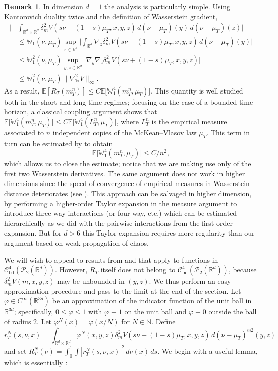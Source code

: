 \documentclass[11pt,reqno]{amsart}
\numberwithin{equation}{section}
\theoremstyle{definition}
\newtheorem{remark}[theorem]{Remark}
\def\E{{\mathbb E}}
\def\R{{\mathbb R}}
\def\N{{\mathbb N}}
\newcommand{\wgrad}{\nabla_{\W}}
\newcommand{\W}{\mathbb W}
\begin{document}
\begin{remark} \label{rem:d=1}
    In dimension $d=1$ the analysis is particularly simple. Using Kantorovich duality twice and the definition of Wasserstein gradient,
    \begin{align*}
        \Big|&\int_{\R^d\times \R^d} \delta_m^2  V(s\nu+(1-s)\mu_T,x,y,z)\,d(\nu-\mu_T)(y)\,d(\nu-\mu_T)(z)\Big|\\
        &\leq \W_1(\nu,\mu_T)\sup_{z\in \R^d} \Big|\int_{\R^d}\nabla_z\delta_m^2 V(s\nu+(1-s)\mu_T,x,y,z)\,d(\nu-\mu_T)(y)\Big|\\
        &\leq \W_1^2(\nu,\mu_T)\sup_{y,z\in \R^d} \Big|\nabla_y\nabla_z\delta_m^2 V(s\nu+(1-s)\mu_T,x,y,z)\Big|\\
        &\leq \W_1^2(\nu,\mu_T)\|\wgrad^2 V\|_{\infty}.
    \end{align*}
    As a result, $\E[R_T(m_T^n)]\leq C\E\big[\W_1^4(m_T^n,\mu_T)\big]$. This quantity is well studied both in the short and long time regimes; focusing on the case of a bounded time horizon, a classical coupling argument shows that $\E\big[\W_1^4(m_T^n,\mu_T)\big]\leq C\E\big[\W_1^4(L_T^n,\mu_T)\big]$, where $L_T^n$ is the empirical measure associated to $n$ independent copies of the McKean--Vlasov law $\mu_T$. This term in turn  can be estimated by \cite[Theorem 2]{Fournier2015-yh} to obtain
    \[\E\big[\W_1^4(m_T^n,\mu_T)\big]\leq C/n^2,\]
    which allows us to close the estimate; notice that we are making use only of the first two Wasserstein derivatives. The same argument does not work in higher dimensions since the speed of convergence of empirical measures in Wasserstein distance deteriorates (see \cite[Theorem 1]{Fournier2015-yh}). This approach can be salvaged in higher dimension, by performing a higher-order Taylor expansion in the measure argument  to introduce three-way interactions (or four-way, etc.) which can be estimated hierarchically as we did with the pairwise interactions from the first-order expansion. But for $d>6$ this Taylor expansion requires more regularity than our argument based on weak propagation of chaos. 
\end{remark}

We will wish  to appeal to results from \cite{Buckdahn2017-op} and \cite{Chassagneux2022-jt} that apply to functions in $\mathcal C_{\text{bd}}^4(\mathcal P_2(\R^d))$. However, $R_T$ itself does not belong to $\mathcal C_{\text{bd}}^4(\mathcal P_2(\R^d))$, because $\delta_m^2V(m,x,y,z)$ may be unbounded in $(y,z)$. We thus perform an easy approximation procedure and pass to the limit at the end of the section. Let $\varphi \in C^\infty(\R^{3d})$ be an approximation of the indicator function of the unit ball in $\R^{3d}$; specifically, $0 \le \varphi \le 1$ with $\varphi\equiv 1$ on the unit ball and $\varphi \equiv 0$ outside the ball of radius $2$. Let $\varphi^N(x)=\varphi(x/N)$ for $N \in \N$. Define
\begin{equation*}
    r^N_T(s,\nu,x)= \int_{\R^d\times \R^d} \varphi^N (x,y,z)\delta_m^2  V(s\nu+(1-s)\mu_T,x,y,z)\,d(\nu-\mu_T)^{\otimes2}(y,z)
\end{equation*}
and set $R_T^N(\nu)=\int_0^1\int |r^N_T(s,\nu,x)|^2\,d\nu(x)\,ds$.
We begin with a useful lemma, which is essentially \cite[Lemma 2.7]{Chassagneux2022-jt}:
\end{document}
